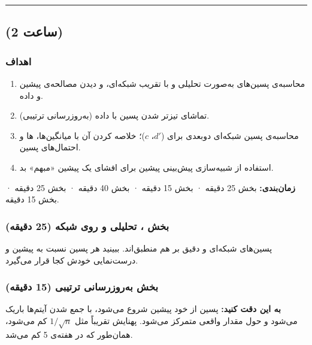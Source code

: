 \begin{center}\rule{0.5\linewidth}{0.5pt}\end{center}


\subsection{\texorpdfstring{ (2 ساعت)}{lab (2 ساعت)}}

\subsubsection{اهداف}

\begin{enumerate}
\def\labelenumi{\arabic{enumi}.}
\tightlist
\item
  محاسبه‌ی پسین‌های  به‌صورت تحلیلی و با تقریب شبکه‌ای، و
  دیدن مصالحه‌ی پیشین و داده.
\item
  تماشای تیزتر شدن پسین با داده (به‌روزرسانی ترتیبی).
\item
  محاسبه‌ی پسین شبکه‌ای دوبعدی برای  (\(d'\)، \(c\))؛ خلاصه کردن
  آن با میانگین‌ها، ها و احتمال‌های پسین.
\item
  استفاده از شبیه‌سازی پیش‌بینی پیشین برای افشای یک پیشین «مبهم» بد.
\end{enumerate}

\textbf{زمان‌بندی:} بخش  25 دقیقه · بخش  15 دقیقه · بخش
 40 دقیقه · بخش  25 دقیقه · بخش  15 دقیقه.

\subsubsection{\texorpdfstring{بخش ، تحلیلی و روی
شبکه (25 دقیقه)}{بخش A: beta-binomial، تحلیلی و روی شبکه (25 دقیقه)}}

پسین‌های شبکه‌ای و دقیق بر هم منطبق‌اند. ببینید هر پسین نسبت به پیشین و
درست‌نمایی خودش کجا قرار می‌گیرد.

\subsubsection{\texorpdfstring{بخش  به‌روزرسانی ترتیبی (15
دقیقه)}{بخش B: به‌روزرسانی ترتیبی (15 دقیقه)}}

\textbf{به این دقت کنید:} پسین از خود پیشین شروع می‌شود، با جمع شدن
آیتم‌ها باریک می‌شود و حول مقدار واقعی متمرکز می‌شود. پهنایش تقریباً مثل
\(1/\sqrt{n}\) کم می‌شود، همان‌طور که  در هفته‌ی 5 کم می‌شد.

